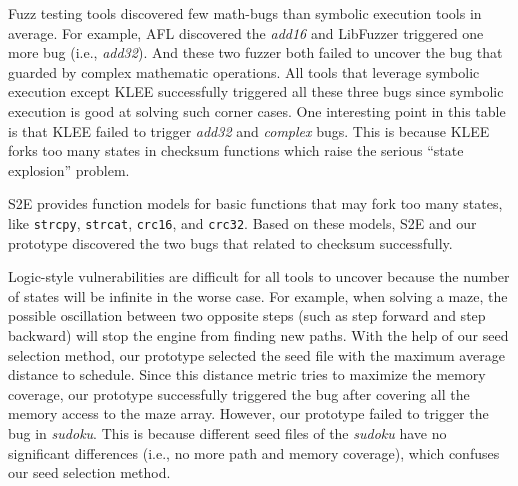 Fuzz testing tools discovered few math-bugs than symbolic execution tools in average.
 For example, AFL discovered the \textit{add16} and LibFuzzer triggered one more bug (i.e., \textit{add32}). 
 And these two fuzzer both failed to uncover the bug that guarded by complex mathematic operations. 
 All tools that leverage symbolic execution except KLEE successfully triggered all these three bugs since symbolic execution is good at solving such corner cases. 
 One interesting point in this table is that KLEE failed to trigger \textit{add32} and \textit{complex} bugs. 
 This is because KLEE forks too many states in checksum functions which raise the serious ``state explosion'' problem. 

S2E provides function models for basic functions that may fork too many states, like \texttt{strcpy}, \texttt{strcat}, \texttt{crc16}, and \texttt{crc32}. Based on these models, S2E and our prototype discovered the two bugs that related to checksum successfully. 

Logic-style vulnerabilities are difficult for all tools to uncover because the number of states will be infinite in the worse case.
 For example, when solving a maze, the possible oscillation between two opposite steps (such as step forward and step backward) will stop the engine from finding new paths.
 With the help of our seed selection method, our prototype selected the seed file with the maximum average distance to schedule. Since this distance metric tries to maximize the memory coverage, our prototype successfully triggered the bug after covering all the memory access to the maze array. 
 However, our prototype failed to trigger the bug in \textit{sudoku}. 
 This is because different seed files of the \textit{sudoku} have no significant differences (i.e., no more path and memory coverage), which confuses our seed selection method.

